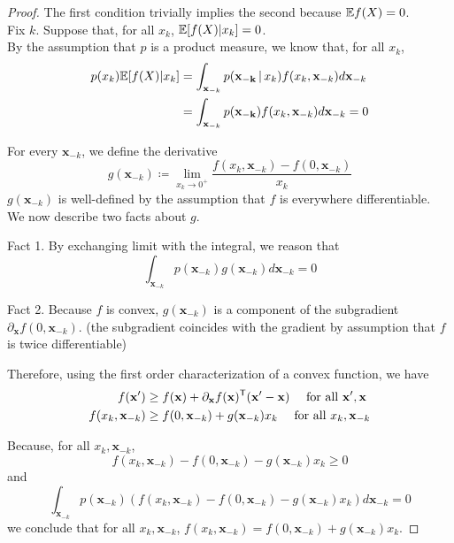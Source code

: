 \documentclass{article}
\begin{document}
\begin{proof}

The first condition trivially implies the second because $\mathbb{E} f(X) = 0$.\\

Fix $k$. Suppose that, for all $x_k$, $\mathbb{E}[ f(X) | x_k] = 0$. \\

By the assumption that $p$ is a product measure, we know that, for all $x_k$,
\begin{align*}
p(x_k) \mathbb{E}[ f(X) | x_k ] &= \int_{\mathbf{x}_{-k}} p(\mathbf{x_{-k}} \,|\, x_k) f(x_k,\mathbf{x}_{-k}) d \mathbf{x}_{-k} \\
		&=  \int_{\mathbf{x}_{-k}} p(\mathbf{x_{-k}}) f(x_k,\mathbf{x}_{-k}) d \mathbf{x}_{-k} =0
\end{align*}

For every $\mathbf{x}_{-k}$, we define the derivative
\[
g(\mathbf{x}_{-k}) \coloneqq  \lim_{x_k \rightarrow 0^+} \frac{f(x_k, \mathbf{x}_{-k}) - f(0, \mathbf{x}_{-k})}{x_k}
\]
$g(\mathbf{x}_{-k})$ is well-defined by the assumption that $f$ is everywhere differentiable.\\

We now describe two facts about $g$.

Fact 1. By exchanging limit with the integral, we reason that 
\[
\int_{\mathbf{x}_{-k}} p(\mathbf{x}_{-k}) g(\mathbf{x}_{-k}) d \mathbf{x}_{-k} = 0
\]

Fact 2. Because $f$ is convex, $g(\mathbf{x}_{-k})$ is a component of the subgradient $\partial_{\mathbf{x}} f(0, \mathbf{x}_{-k})$. (the subgradient coincides with the gradient by assumption that $f$ is twice differentiable)

Therefore, using the first order characterization of a convex function, we have
\begin{align*}
f(\mathbf{x}') &\geq f( \mathbf{x}) + \partial_{\mathbf{x}} f(\mathbf{x})^{\mathsf{T}} (\mathbf{x}' - \mathbf{x}) \quad \textrm{ for all } \mathbf{x}', \mathbf{x} \\
f(x_k, \mathbf{x}_{-k}) &\geq f(0, \mathbf{x}_{-k}) + g(\mathbf{x}_{-k}) x_k \quad \textrm{ for all } x_k, \mathbf{x}_{-k}
\end{align*}


Because, for all $x_k, \mathbf{x}_{-k}$, 
\[
f(x_k, \mathbf{x}_{-k}) - f(0, \mathbf{x}_{-k}) - g(\mathbf{x}_{-k}) x_k \geq 0
\]
and
\[
\int_{\mathbf{x}_{-k}} p(\mathbf{x}_{-k}) (f(x_k, \mathbf{x}_{-k}) - f(0, \mathbf{x}_{-k}) - g(\mathbf{x}_{-k}) x_k) d\mathbf{x}_{-k} = 0
\]
we conclude that for all $x_k, \mathbf{x}_{-k}$, $f(x_k, \mathbf{x}_{-k}) = f(0, \mathbf{x}_{-k}) + g(\mathbf{x}_{-k}) x_k$.


\end{proof}
\end{document}
